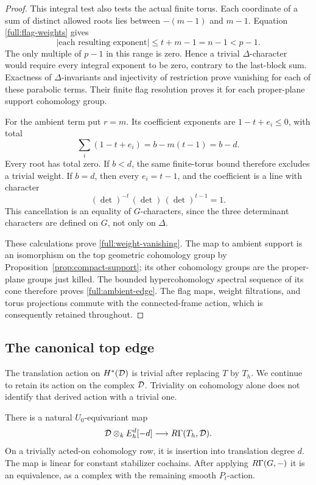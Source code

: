 \begin{proof}
This integral test also tests the actual finite torus.
Each coordinate of a sum of distinct allowed roots lies
between $-(m-1)$ and $m-1$.  Equation
\eqref{full:flag-weights} gives
\[
 |\text{each resulting exponent}|
             \leq t+m-1=n-1<p-1.
\]
The only multiple of $p-1$ in this range is zero.
Hence a trivial $\Delta$-character would require every
integral exponent to be zero, contrary to the last-block
sum.  Exactness of $\Delta$-invariants and injectivity of
restriction prove vanishing for each of these parabolic
terms.  Their finite flag resolution proves it for each
proper-plane support cohomology group.

For the ambient term put $r=m$.  Its coefficient exponents
are $1-t+e_i\leq0$, with total
\[
 \sum_i(1-t+e_i)=b-m(t-1)=b-d.
\]
Every root has total zero.  If $b<d$, the same finite-torus
bound therefore excludes a trivial weight.  If $b=d$, then
every $e_i=t-1$, and the coefficient is a line with character
\[
 (\det)^{-t}\,(\det)\,(\det)^{t-1}=1.
\]
This cancellation is an equality of $G$-characters, since
the three determinant characters are defined on $G$, not
only on $\Delta$.

These calculations prove \eqref{full:weight-vanishing}.
The map to ambient support is an isomorphism on the top
geometric cohomology group by
Proposition~\ref{prop:compact-support}; its other cohomology
groups are the proper-plane groups just killed.
The bounded hypercohomology spectral sequence of its cone
therefore proves \eqref{full:ambient-edge}.
The flag maps, weight filtrations, and torus projections
commute with the connected-frame action, which is consequently
retained throughout.
\end{proof}

\subsection{The canonical top edge}

The translation action on $H^*(\mathcal D)$ is trivial after replacing $T$
by $T_h$.  We continue to retain its action on the complex $\mathcal D$.
Triviality on cohomology alone does not identify that derived action
with a trivial one.

\begin{lemma}
\label{full:top-edge}
There is a natural $U_0$-equivariant map
\begin{equation}
\label{full:top-edge-map}
 \mathcal D\otimes_k E_h^d[-d]\longrightarrow R\Gamma(T_h,\mathcal D).
\end{equation}
On a trivially acted-on cohomology row, it is insertion into
translation degree $d$.  The map is linear for constant stabilizer
cochains.  After applying $R\Gamma(G,-)$ it is an equivalence,
as a complex with the remaining smooth $P_t$-action.
\end{lemma}

